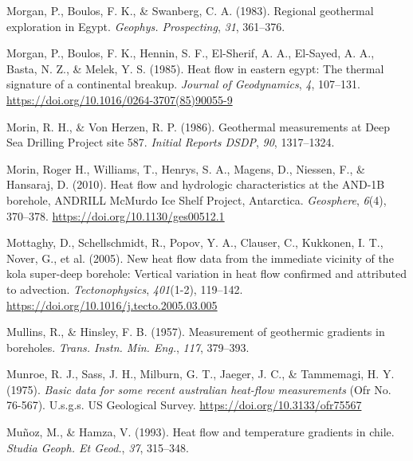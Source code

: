 \documentclass[draft,linenumbers]{agujournal2018}
\begin{document}
\leavevmode{}%
Morgan, P., Boulos, F. K., \& Swanberg, C. A. (1983). Regional
geothermal exploration in {Egypt}. \emph{Geophys. Prospecting},
\emph{31}, 361--376.

\leavevmode{}%
Morgan, P., Boulos, F. K., Hennin, S. F., El-Sherif, A. A., El-Sayed, A.
A., Basta, N. Z., \& Melek, Y. S. (1985). Heat flow in eastern egypt:
The thermal signature of a continental breakup. \emph{Journal of
Geodynamics}, \emph{4}, 107--131.
\url{https://doi.org/10.1016/0264-3707(85)90055-9}

\leavevmode{}%
Morin, R. H., \& Von Herzen, R. P. (1986). Geothermal measurements at
{Deep Sea Drilling Project} site 587. \emph{Initial Reports DSDP},
\emph{90}, 1317--1324.

\leavevmode{}%
Morin, Roger H., Williams, T., Henrys, S. A., Magens, D., Niessen, F.,
\& Hansaraj, D. (2010). Heat flow and hydrologic characteristics at the
{AND-1B} borehole, {ANDRILL McMurdo Ice Shelf Project, Antarctica}.
\emph{Geosphere}, \emph{6}(4), 370--378.
\url{https://doi.org/10.1130/ges00512.1}

\leavevmode{}%
Mottaghy, D., Schellschmidt, R., Popov, Y. A., Clauser, C., Kukkonen, I.
T., Nover, G., et al. (2005). New heat flow data from the immediate
vicinity of the kola super-deep borehole: Vertical variation in heat
flow confirmed and attributed to advection. \emph{Tectonophysics},
\emph{401}(1-2), 119--142.
\url{https://doi.org/10.1016/j.tecto.2005.03.005}

\leavevmode{}%
Mullins, R., \& Hinsley, F. B. (1957). Measurement of geothermic
gradients in boreholes. \emph{Trans. Instn. Min. Eng.}, \emph{117},
379--393.

\leavevmode{}%
Munroe, R. J., Sass, J. H., Milburn, G. T., Jaeger, J. C., \& Tammemagi,
H. Y. (1975). \emph{Basic data for some recent australian heat-flow
measurements} (Ofr No. 76-567). U.s.g.s. {US} Geological Survey.
\url{https://doi.org/10.3133/ofr75567}

\leavevmode{}%
Muñoz, M., \& Hamza, V. (1993). Heat flow and temperature gradients in
chile. \emph{Studia Geoph. Et Geod.}, \emph{37}, 315--348.
\end{document}
